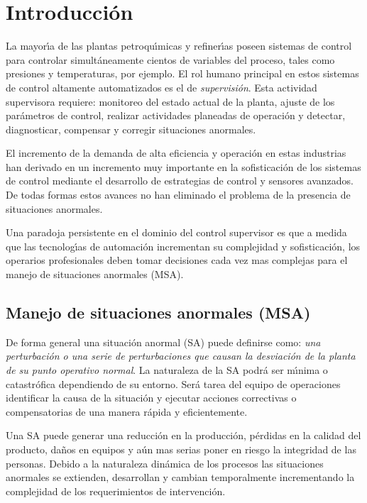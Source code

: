 \chapter{Introducci{\'o}n}
La mayor{\'\i}a de las plantas petroqu{\'\i}micas y refiner{\'\i}as poseen sistemas de control para
controlar simult{\'a}neamente cientos de variables del proceso, tales como presiones y temperaturas, por
ejemplo. El rol humano principal en estos sistemas de control altamente automatizados es el de
\textit{supervisi{\'o}n}. Esta actividad supervisora requiere: monitoreo del estado actual de la planta, ajuste
de los par{\'a}metros de control, realizar actividades planeadas de operaci{\'o}n y detectar, diagnosticar,
compensar y corregir situaciones anormales.

El incremento de la demanda de alta eficiencia y operaci{\'o}n en estas industrias han derivado en un incremento
muy importante en la sofisticaci{\'o}n de los sistemas de control mediante el desarrollo de estrategias de
control y sensores avanzados. De todas formas estos avances no han eliminado el problema de la presencia de
situaciones anormales.

Una paradoja persistente en el dominio del control supervisor es que a medida que las tecnolog{\'\i}as de
automaci{\'o}n incrementan su complejidad y sofisticaci{\'o}n, los operarios profesionales deben tomar decisiones
cada vez mas complejas para el manejo de situaciones anormales (MSA).

\section{Manejo de situaciones anormales (MSA)}
De forma general una situaci{\'o}n anormal (SA) puede definirse como: \textit{una perturbaci{\'o}n o una serie de
perturbaciones que causan la desviaci{\'o}n de la planta de su punto operativo normal}. La naturaleza de la SA
podr{\'a} ser m{\'\i}nima o catastr{\'o}fica dependiendo de su entorno. Ser{\'a} tarea del equipo de operaciones identificar
la causa de la situaci{\'o}n y ejecutar acciones correctivas o compensatorias de una manera r{\'a}pida y
eficientemente.

Una SA puede generar una reducci{\'o}n en la producci{\'o}n, p{\'e}rdidas en la calidad del producto, da{\~n}os en equipos y
a{\'u}n mas serias poner en riesgo la integridad de las personas. Debido a la naturaleza din{\'a}mica de los
procesos las situaciones anormales se extienden, desarrollan y cambian temporalmente incrementando la
complejidad de los requerimientos de intervenci{\'o}n.

